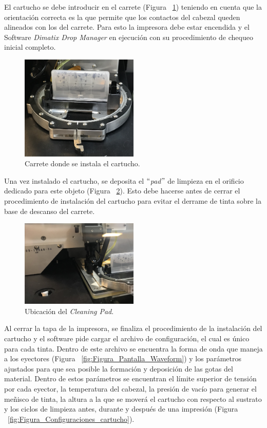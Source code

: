 El cartucho se debe introducir en el carrete (Figura ~\ref{fig:Figura_Carrete1}) teniendo en cuenta que la orientación correcta es la que permite que los contactos del cabezal queden alineados con los del carrete. Para esto la impresora debe estar encendida y el Software \textit{Dimatix Drop Manager} en ejecución con su procedimiento de chequeo inicial completo.

\begin{figure}[H]
  \centering
    \includegraphics[width=0.5\textwidth]{Figuras/Figura_Carrete1}
  \caption{Carrete donde se instala el cartucho.}
  \label{fig:Figura_Carrete1}
\end{figure}

Una vez instalado el cartucho, se deposita el $``$\textit{pad}$"$ de limpieza en el orificio dedicado para este objeto (Figura ~\ref{fig:Figura_Orificio_Cleaning_Pad}). Esto debe hacerse antes de cerrar el procedimiento de instalación del cartucho para evitar el derrame de tinta sobre la base de descanso del carrete.

\begin{figure}[H]
  \centering
    \includegraphics[width=0.5\textwidth]{Figuras/Figura_Orificio_Cleaning_Pad}
  \caption{Ubicación del \textit{Cleaning Pad}.}
  \label{fig:Figura_Orificio_Cleaning_Pad}
\end{figure}

Al cerrar la tapa de la impresora, se finaliza el procedimiento de la instalación del cartucho y el software pide cargar el archivo de configuración, el cual es único para cada tinta. Dentro de este archivo se encuentra la forma de onda que maneja a los eyectores (Figura ~\ref{fig:Figura_Pantalla_Waveform}) y los parámetros ajustados para que sea posible la formación y deposición de las gotas del material. Dentro de estos parámetros se encuentran el límite superior de tensión por cada eyector, la temperatura del cabezal, la presión de vacío para generar el meñisco de tinta, la altura a la que se moverá el cartucho con respecto al sustrato y los ciclos de limpieza antes, durante y después de una impresión (Figura ~\ref{fig:Figura_Configuraciones_cartucho}).

